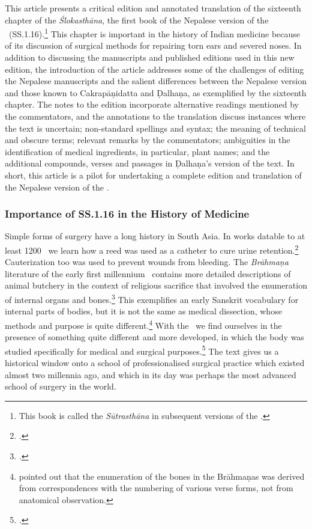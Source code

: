 This article presents a critical edition and annotated translation of the sixteenth chapter of the \emph{Ślokasthāna}, the first book of the Nepalese version of the \SS\ (SS.1.16).\footnote{This book is called the \emph{Sūtrasthāna} in subsequent versions of the \SS.} This chapter is important in the history of Indian medicine because of its discussion of surgical methods for repairing torn ears and severed noses. In addition to discussing the manuscripts and published editions used in this new edition, the introduction of the article addresses some of the challenges of editing the Nepalese manuscripts and the salient differences between the Nepalese version and those known to Cakrapāṇidatta and Ḍalhaṇa, as exemplified by the sixteenth chapter. The notes to the edition incorporate alternative readings mentioned by the commentators, and the annotations to the translation discuss instances where the text is uncertain; non-standard spellings and syntax; the meaning of technical and obscure terms; relevant remarks by the commentators; ambiguities in the identification of medical ingredients, in particular, plant names; and the additional compounds, verses and passages in Ḍalhaṇa's version of the text. In short, this article is a pilot for undertaking a complete edition and translation of the Nepalese version of the \SS.


\subsubsection{Importance of SS.1.16 in the History of Medicine}


Simple forms of surgery have a long history in South Asia. In works datable to at
least 1200 \BC\ we learn how a reed was used as a catheter to cure urine
retention.\footcite[70--71]{zysk-1985} Cauterization too was used to prevent
wounds from bleeding. The \emph{Brāhmaṇa} literature of the early first 
millennium
\BC\ contains more detailed descriptions of animal butchery in the context of
religious sacrifice that involved the enumeration of internal organs and
bones.\footcite{mala-1996}   This exemplifies an early Sanskrit vocabulary for
internal parts of bodies, but it is not the same as medical dissection, whose
methods and purpose is quite different.\footnote{\citet{keit-1908} pointed out
that the enumeration of the bones in the Brāhmaṇas was derived from
correspondences with the numbering of various verse forms, not from anatomical
observation.}  With the \SS\ we find ourselves 
in
the presence of something quite different and more developed, in which the body
was studied specifically for medical and surgical purposes.\footcite{zysk-1986} 
The text gives us a historical window onto a school of
professionalised surgical practice which existed almost two millennia ago, and
which in its day was perhaps the most advanced school of surgery in the world.


